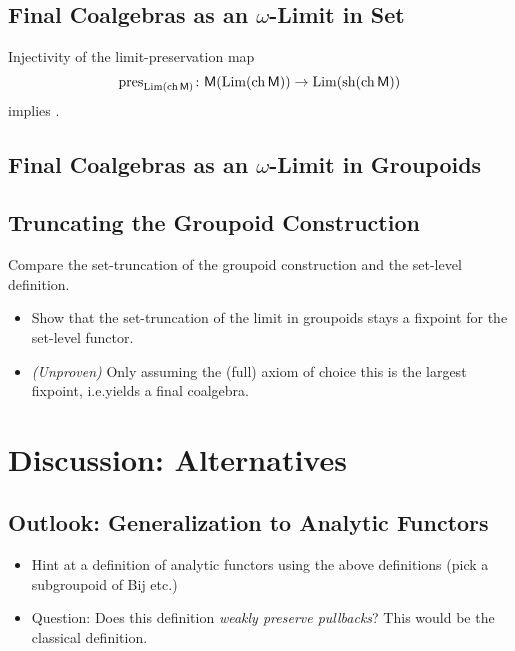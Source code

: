 \documentclass[runningheads]{llncs}
\begin{document}
\subsection{Final Coalgebras as an $\omega$-Limit in Set}


\begin{theorem}
    Injectivity of the limit-preservation map
    \[
        \operatorname{pres}_{\operatorname{Lim} (\operatorname{ch} \mathsf{M})}\colon
            \mathsf{M} (\operatorname{Lim} (\operatorname{ch} \mathsf{M}))
            \to
            \operatorname{Lim} (\operatorname{sh}(\operatorname{ch}\mathsf{M}))
    \]
    implies \LLPO.
\end{theorem}


\subsection{Final Coalgebras as an $\omega$-Limit in Groupoids}

\subsection{Truncating the Groupoid Construction}

Compare the set-truncation of the groupoid construction
and the set-level definition.

\begin{itemize}
    \item
        Show that the set-truncation of the limit in
        groupoids stays a fixpoint for the set-level functor.
    \item
        \emph{(Unproven)}
        Only assuming the (full) axiom of choice this is the
        largest fixpoint, i.e.\@ yields a final coalgebra.
\end{itemize}

\section{Discussion: Alternatives}
\subsection{Outlook: Generalization to Analytic Functors}

\begin{itemize}
    \item Hint at a definition of analytic functors using
        the above definitions (pick a subgroupoid of Bij etc.)
    \item Question:
        Does this definition \emph{weakly preserve pullbacks}?
        This would be the classical definition.
\end{itemize}
\end{document}
